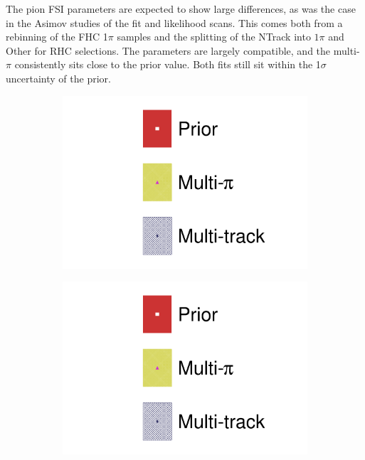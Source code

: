 The pion FSI parameters are expected to show large differences, as was the case in the Asimov studies of the fit and likelihood scans. This comes both from a rebinning of the FHC 1$\pi$ samples and the splitting of the NTrack into $1\pi$ and Other for RHC selections. The parameters are largely compatible, and the multi-$\pi$ consistently sits close to the prior value. Both fits still sit within the 1$\sigma$ uncertainty of the prior.
\begin{figure}[h]
	\centering
	\begin{subfigure}[t]{0.49\textwidth}
		\includegraphics[width=\textwidth,page=18, trim={0mm 0mm 0mm 9mm}, clip]{figures/mach3/2018/data/2018a_FixedCov_RedCov_Mpi_Data_merg_2018a_NewDetMatrix_OrderSwitched_Data2to8_ActualData_merge}
	\end{subfigure}
	\begin{subfigure}[t]{0.49\textwidth}
		\includegraphics[width=\textwidth,page=19, trim={0mm 0mm 0mm 9mm}, clip]{figures/mach3/2018/data/2018a_FixedCov_RedCov_Mpi_Data_merg_2018a_NewDetMatrix_OrderSwitched_Data2to8_ActualData_merge}
	\end{subfigure}
	

\end{figure}
